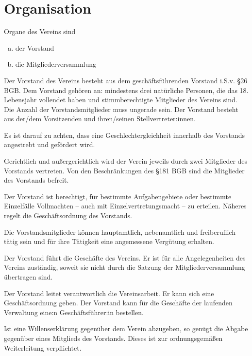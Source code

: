 \section{Organisation}
\begin{contract}

    Organe des Vereins sind
    \begin{enumerate}[(a)]
        \item der Vorstand
        \item die Mitgliederversammlung
    \end{enumerate}

    Der Vorstand des Vereins besteht aus dem geschäftsführenden Vorstand i.S.v. \S 26 BGB. Dem Vorstand gehören an: mindestens drei natürliche Personen, die das 18. Lebensjahr vollendet haben und stimmberechtigte Mitglieder des Vereins sind. Die Anzahl der Vorstandsmitglieder muss ungerade sein. Der Vorstand besteht aus der/dem Vorsitzenden und ihren/seinen Stellvertreter:innen.

    Es ist darauf zu achten, dass eine Geschlechtergleichheit innerhalb des Vorstands angestrebt und gefördert wird.

    Gerichtlich und außergerichtlich wird der Verein jeweils durch zwei Mitglieder des Vorstands vertreten. Von den Beschränkungen des \S 181 BGB sind die Mitglieder des Vorstands befreit.

    Der Vorstand ist berechtigt, für bestimmte Aufgabengebiete oder bestimmte Einzelfälle Vollmachten – auch mit Einzelvertretungsmacht – zu erteilen. Näheres regelt die Geschäftsordnung des Vorstands.

    Die Vorstandsmitglieder können hauptamtlich, nebenamtlich und freiberuflich tätig sein und für ihre Tätigkeit eine angemessene Vergütung erhalten.

    Der Vorstand führt die Geschäfte des Vereins. Er ist für alle Angelegenheiten des Vereins zuständig, soweit sie nicht durch die Satzung der Mitgliederversammlung übertragen sind.

    Der Vorstand leitet verantwortlich die Vereinsarbeit. Er kann sich eine Geschäftsordnung geben. Der Vorstand kann für die Geschäfte der laufenden Verwaltung eine:n Geschäftsführer:in bestellen.

    Ist eine Willenserklärung gegenüber dem Verein abzugeben, so genügt die Abgabe gegenüber eines Mitglieds des Vorstands. Dieses ist zur ordnungsgemäßen Weiterleitung verpflichtet.


\end{contract}

